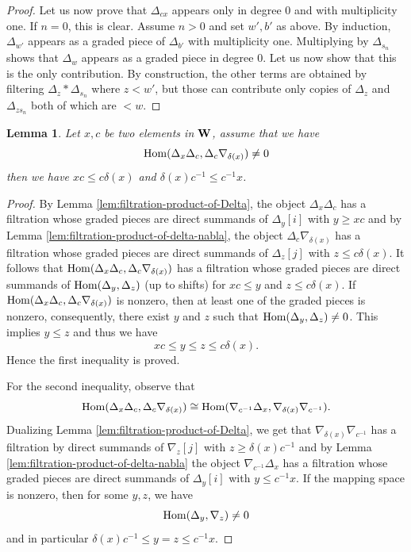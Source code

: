 \documentclass[article, 10pt, oneside, reqno]{amsart}
\theoremstyle{plain}
\newtheorem{lem}[thm]{Lemma}
\theoremstyle{definition}
\theoremstyle{remark}
\begin{document}
\begin{proof}
Let us now prove that $\Delta_{cx}$ appears only in degree $0$ and with multiplicity one. If $n = 0$, this is clear. Assume $n > 0$ and set $w', b'$ as above. By induction, $\Delta_{w'}$ appears as a graded piece of $\Delta_{b'}$ with multiplicity one. Multiplying by $\Delta_{s_n}$ shows that $\Delta_w$ appears as a graded piece in degree $0$. Let us now show that this is the only contribution. By construction, the other terms are obtained by filtering $\Delta_z *\Delta_{s_n}$ where $z < w'$, but those can contribute only copies of $\Delta_z$ and $\Delta_{zs_n}$ both of which are $< w$. 
\end{proof}

\begin{lem}\label{lem:control-mapping-space}
Let $x,c$ be two elements in $\mathbf{W}$, assume that we have 
$$\mathrm{Hom}(\Delta_x\Delta_c, \Delta_c\nabla_{\delta(x)}) \neq 0$$
then we have $xc \leq c\delta(x)$ and $\delta(x)c^{-1} \leq c^{-1}x$. 
\end{lem}

\begin{proof}
By Lemma \ref{lem:filtration-product-of-Delta}, the object $\Delta_x\Delta_c$ has a filtration whose graded pieces are direct summands of $\Delta_y[i]$ with $y \geq xc$ and by Lemma \ref{lem:filtration-product-of-delta-nabla}, the object $\Delta_c\nabla_{\delta(x)}$ has a filtration whose graded pieces are direct summands of $\Delta_z[j]$ with $z \leq c\delta(x)$. 
It follows that $\mathrm{Hom}(\Delta_x\Delta_c, \Delta_c\nabla_{\delta(x)})$ has a filtration whose graded pieces are direct summands of $\mathrm{Hom}(\Delta_y,\Delta_z)$ (up to shifts) for $xc \leq y$ and $z \leq c\delta(x)$. If $\mathrm{Hom}(\Delta_x\Delta_c, \Delta_c\nabla_{\delta(x)})$ is nonzero, then at least one of the graded pieces is nonzero, consequently, there exist $y$ and $z$ such that $\mathrm{Hom}(\Delta_y, \Delta_z) \neq 0$. This implies $y \leq z$ and thus we have 
$$xc \leq y \leq z \leq c\delta(x).$$
Hence the first inequality is proved.

For the second inequality, observe that 
$$\mathrm{Hom}(\Delta_x\Delta_c, \Delta_c\nabla_{\delta(x)}) \cong \mathrm{Hom}(\nabla_{c^{-1}}\Delta_x, \nabla_{\delta(x)}\nabla_{c^{-1}}).$$
Dualizing Lemma \ref{lem:filtration-product-of-Delta}, we get that $\nabla_{\delta(x)}\nabla_{c^{-1}}$ has a filtration by direct summands of $\nabla_z[j]$ with $z \geq \delta(x)c^{-1}$ and by Lemma \ref{lem:filtration-product-of-delta-nabla}  the object $\nabla_{c^{-1}}\Delta_x$ has a filtration whose graded pieces are direct summands of $\Delta_y[i]$ with $y \leq c^{-1}x$. If the mapping space is nonzero, then for some $y,z$, we have 
$$\mathrm{Hom}(\Delta_y, \nabla_z) \neq 0$$
and in particular $\delta(x)c^{-1} \leq y = z \leq c^{-1}x$.
\end{proof}
\end{document}
